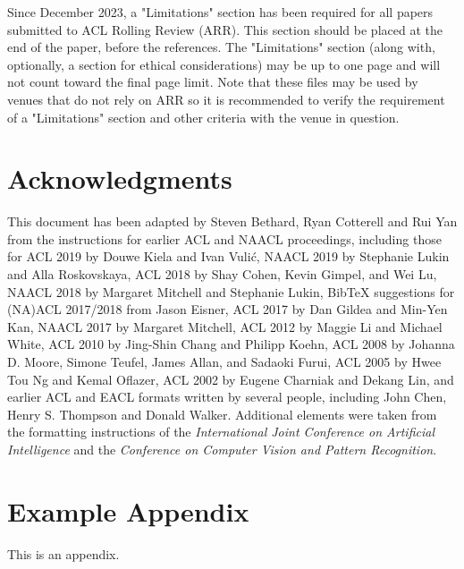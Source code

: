 \documentclass[11pt]{article}
\begin{document}
Since December 2023, a "Limitations" section has been required for all papers submitted to ACL Rolling Review (ARR). This section should be placed at the end of the paper, before the references. The "Limitations" section (along with, optionally, a section for ethical considerations) may be up to one page and will not count toward the final page limit. Note that these files may be used by venues that do not rely on ARR so it is recommended to verify the requirement of a "Limitations" section and other criteria with the venue in question.

\section*{Acknowledgments}

This document has been adapted
by Steven Bethard, Ryan Cotterell and Rui Yan
from the instructions for earlier ACL and NAACL proceedings, including those for
ACL 2019 by Douwe Kiela and Ivan Vuli\'{c},
NAACL 2019 by Stephanie Lukin and Alla Roskovskaya,
ACL 2018 by Shay Cohen, Kevin Gimpel, and Wei Lu,
NAACL 2018 by Margaret Mitchell and Stephanie Lukin,
Bib\TeX{} suggestions for (NA)ACL 2017/2018 from Jason Eisner,
ACL 2017 by Dan Gildea and Min-Yen Kan,
NAACL 2017 by Margaret Mitchell,
ACL 2012 by Maggie Li and Michael White,
ACL 2010 by Jing-Shin Chang and Philipp Koehn,
ACL 2008 by Johanna D. Moore, Simone Teufel, James Allan, and Sadaoki Furui,
ACL 2005 by Hwee Tou Ng and Kemal Oflazer,
ACL 2002 by Eugene Charniak and Dekang Lin,
and earlier ACL and EACL formats written by several people, including
John Chen, Henry S. Thompson and Donald Walker.
Additional elements were taken from the formatting instructions of the \emph{International Joint Conference on Artificial Intelligence} and the \emph{Conference on Computer Vision and Pattern Recognition}.

%


\appendix

\section{Example Appendix}
\label{sec:appendix}

This is an appendix.
\end{document}

